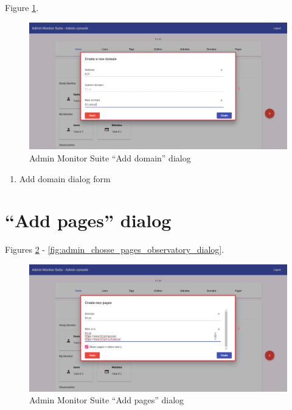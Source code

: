 Figure \ref{fig:admin_add_domain_dialog}.

\begin{figure}[H]
    \centering
    \includegraphics[width=\linewidth]{lib/images/admin/admin_add_domain_dialog.png}
    \caption{Admin Monitor Suite ``Add domain'' dialog}
    \label{fig:admin_add_domain_dialog}
\end{figure}

\begin{enumerate}
    \item Add domain dialog form
\end{enumerate}

\clearpage

\section{``Add pages'' dialog}
\label{sec:admin_add_pages_dialog}

Figures \ref{fig:admin_add_pages_dialog} - \ref{fig:admin_chosse_pages_observatory_dialog}.

\begin{figure}[H]
    \centering
    \includegraphics[width=\linewidth]{lib/images/admin/admin_add_pages_dialog.png}
    \caption{Admin Monitor Suite ``Add pages'' dialog}
    \label{fig:admin_add_pages_dialog}
\end{figure}

